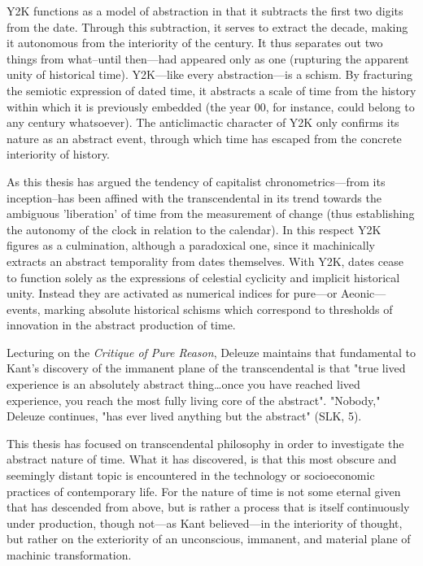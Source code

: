 Y2K functions as a model of abstraction in that it subtracts the first two
digits from the date. Through this subtraction, it serves to extract the decade, making it autonomous from the interiority of the century. It thus separates out two things from what--until then---had appeared only as one (rupturing the apparent unity of historical time). Y2K---like every abstraction---is a schism. By fracturing the semiotic expression of dated time, it abstracts a scale of time from the history within which it is previously embedded (the year 00, for instance, could belong to any century whatsoever). The anticlimactic character of Y2K only confirms its nature as an abstract event, through which time has escaped from the concrete interiority of history.

As this thesis has argued the tendency of capitalist chronometrics---from its inception--has been affined with the transcendental in its trend towards the ambiguous 'liberation' of time from the measurement of change (thus establishing the autonomy of the clock in relation to the calendar). In this respect Y2K figures as a culmination, although a paradoxical one, since it machinically extracts an abstract temporality from dates themselves. With Y2K, dates cease to function solely as the expressions of celestial cyclicity and implicit historical unity. Instead they are activated as numerical indices for pure---or Aeonic---events, marking absolute historical schisms which correspond to thresholds of
innovation in the abstract production of time.

Lecturing on the \textit{Critique of Pure Reason}, Deleuze maintains that fundamental to Kant's discovery of the immanent plane of the transcendental is that "true lived experience is an absolutely abstract thing\dots once you have reached lived experience, you reach the most fully living core of the abstract".
"Nobody," Deleuze continues, "has ever lived anything but the abstract" (SLK, 5).

This thesis has focused on transcendental philosophy in order to investigate the abstract nature of time. What it has discovered, is that this most obscure and seemingly distant topic is encountered in the technology or socioeconomic practices of contemporary life. For the nature of time is not some eternal given that has descended from above, but is rather a process that is itself continuously under production, though not---as Kant believed---in the interiority of thought, but rather on the exteriority of an unconscious, immanent, and material plane of machinic transformation. 